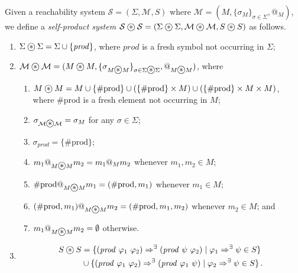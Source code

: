 \documentclass{article}
\newcommand\oast{\stackMath\mathbin{\stackinset{c}{0ex}{c}{0ex}{\ast}{\bigcirc}}}
\begin{document}
\begin{definition}\label{def:RLproduct}
Given a reachability system $\mathcal{S} = (\Sigma, \mathcal{M}, S)$
where $\mathcal{M} = (M, \{\sigma_M\}_{\sigma \in \Sigma}, @_M)$,
we define a \emph{self-product system}
$\mathcal{S}\oast{}\mathcal{S} = (\Sigma\oast{}\Sigma, \mathcal{M}\oast{}\mathcal{M}, S\oast{}S)$ as follows.
\begin{enumerate}
    \item $\Sigma\oast{}\Sigma = \Sigma \cup \{ \mathit{prod} \}$, where $\mathit{prod}$ is a fresh symbol not occurring in $\Sigma$;
    \item $\mathcal{M}\oast{}\mathcal{M} = (M\oast{}M, \{\sigma_{M\oast{}M}\}_{\sigma \in \Sigma\oast{}\Sigma}, @_{M\oast{}M})$, where
    \begin{enumerate}
        \item $M\oast{}M = M \cup \{ \mathrm{\#prod} \} \cup (\{ \mathrm{\#prod} \} \times M) \cup (\{ \mathrm{\#prod} \} \times M \times M)$, where $\mathrm{\#prod}$ is a fresh element not occurring in $M$; 
        \item $\sigma_{\mathcal{M} \oast \mathcal{M}} = \sigma_M$ for any $\sigma \in \Sigma$;
        \item $\sigma_{\mathit{prod}} = \{ \mathrm{\#prod} \}$;
        \item $m_1 @_{M\oast{}M} m_2 = m_1 @_M m_2$ whenever $m_1,m_2 \in M$;
        \item $\mathrm{\#prod} @_{M\oast{}M} m_1 = (\mathrm{\#prod}, m_1)$ whenever $m_1 \in M$;
        \item $(\mathrm{\#prod}, m_1) @_{M\oast{}M} m_2 = (\mathrm{\#prod}, m_1, m_2)$ whenever $m_2 \in M$; and
        \item $m_1 @_{M\oast{}M} m_2 = \emptyset$ otherwise.
    \end{enumerate}
    \item
    \begin{align*}
        S \oast{} S &= \{ (\mathit{prod}\ \varphi_1\ \varphi_2) \Rightarrow^\exists (\mathit{prod}\ \psi\ \varphi_2) \mid \varphi_1 \Rightarrow^\exists \psi \in S \} \\
                     & \cup \{ (\mathit{prod}\ \varphi_1\ \varphi_2) \Rightarrow^\exists (\mathit{prod}\ \varphi_1\ \psi) \mid \varphi_2 \Rightarrow^\exists \psi \in S \}  \, .
    \end{align*}
\end{enumerate}
\end{definition}
\end{document}

